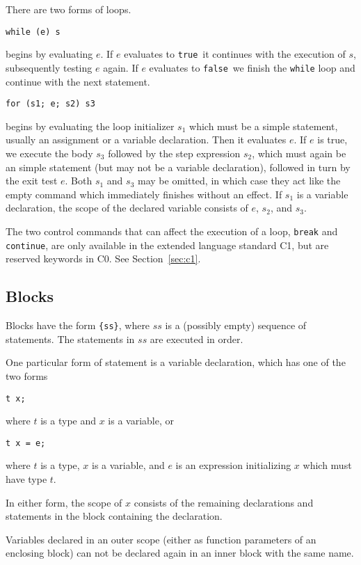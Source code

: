 \documentclass[11pt]{article}
\newcommand{\vtrue}{\texttt{true}}
\newcommand{\vfalse}{\texttt{false}}
\begin{document}
There are two forms of loops.

\begin{verbatim}
while (e) s
\end{verbatim}
begins by evaluating $e$.  If $e$ evaluates to \vtrue\ it
continues with the execution of $s$, subsequently testing $e$
again.  If $e$ evaluates to \vfalse\ we finish the \verb'while'
loop and continue with the next statement.

\begin{verbatim}
for (s1; e; s2) s3
\end{verbatim}
begins by evaluating the loop initializer $s_1$ which must be a simple
statement, usually an assignment or a variable declaration.  Then it
evaluates $e$.  If $e$ is true, we execute the body $s_3$ followed by
the step expression $s_2$, which must again be an simple statement
(but may not be a variable declaration), followed in turn by the exit
test $e$.  Both $s_1$ and $s_3$ may be omitted, in which case they act
like the empty command which immediately finishes without an effect.
If $s_1$ is a variable declaration, the scope of the declared variable
consists of $e$, $s_2$, and $s_3$.

The two control commands that can affect the execution of a
loop, \verb'break' and \verb'continue', are only available
in the extended language standard C1, but are reserved
keywords in C0.  See Section~\ref{sec:c1}.

\subsection{Blocks}

Blocks have the form \verb'{ss}', where $ss$ is a (possibly empty)
sequence of statements.  The statements in $ss$ are executed in order.

One particular form of statement is a variable declaration, which has
one of the two forms
\begin{verbatim}
t x;
\end{verbatim}
where $t$ is a type and $x$ is a variable, or
\begin{verbatim}
t x = e;
\end{verbatim}
where $t$ is a type, $x$ is a variable, and $e$ is
an expression initializing $x$ which must have type $t$.

In either form, the scope of $x$ consists of the remaining
declarations and statements in the block containing the
declaration.

Variables declared in an outer scope (either as function
parameters of an enclosing block) can not be declared again
in an inner block with the same name.
\end{document}
